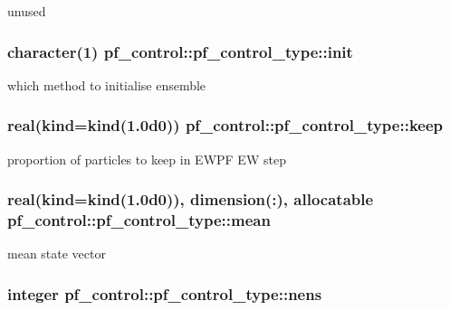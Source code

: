 unused 

\hypertarget{structpf__control_1_1pf__control__type_ab024d9ea51de1956c671b483f1c9d020}{
\subsubsection[{init}]{\setlength{\rightskip}{0pt plus 5cm}character(1) pf\-\_\-control\-::pf\-\_\-control\-\_\-type\-::init}}\label{structpf__control_1_1pf__control__type_ab024d9ea51de1956c671b483f1c9d020}


which method to initialise ensemble 

\hypertarget{structpf__control_1_1pf__control__type_a32d13f7de6d41376980374e9ae2c2a62}{
\subsubsection[{keep}]{\setlength{\rightskip}{0pt plus 5cm}real(kind=kind(1.\-0d0)) pf\-\_\-control\-::pf\-\_\-control\-\_\-type\-::keep}}\label{structpf__control_1_1pf__control__type_a32d13f7de6d41376980374e9ae2c2a62}


proportion of particles to keep in E\-W\-P\-F E\-W step 

\hypertarget{structpf__control_1_1pf__control__type_a90ea6d211c5b4d70ab99e12e9a8dc8d5}{
\subsubsection[{mean}]{\setlength{\rightskip}{0pt plus 5cm}real(kind=kind(1.\-0d0)), dimension(\-:), allocatable pf\-\_\-control\-::pf\-\_\-control\-\_\-type\-::mean}}\label{structpf__control_1_1pf__control__type_a90ea6d211c5b4d70ab99e12e9a8dc8d5}


mean state vector 

\hypertarget{structpf__control_1_1pf__control__type_a54b2dd5d94eb5fd34e0384490b7a293e}{
\subsubsection[{nens}]{\setlength{\rightskip}{0pt plus 5cm}integer pf\-\_\-control\-::pf\-\_\-control\-\_\-type\-::nens}}\label{structpf__control_1_1pf__control__type_a54b2dd5d94eb5fd34e0384490b7a293e}


